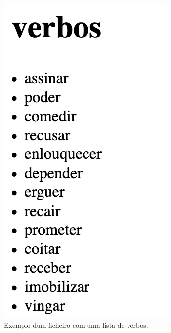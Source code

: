 \documentclass[11pt,a4paper]{report}
\begin{document}
\begin{figure}[H]
\centering
\includegraphics[scale=0.6]{verbos.png}
\caption{Exemplo dum ficheiro com uma lista de verbos.}
\label{img:verbos}
\end{figure}
\end{document}

